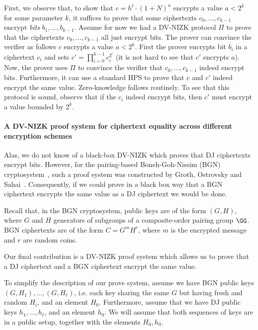 First, we observe that, to show that $c = h^t \cdot (1 + N)^a$ encrypts a value $a < 2^k$ for some parameter $k$, it suffices to prove that some ciphertexts $c_0,\dots,c_{k-1}$ encrypt \emph{bits} $b_1,\dots,b_{k-1}$. Assume for now we had a DV-NIZK protocol $\Pi$ to prove that the ciphertexts $c_0,\dots,c_{k-1}$ all just encrypt bits. The prover can convince the verifier as follows $c$ encrypts a value $a < 2^k$. First the prover encrypts bit $b_i$ in a ciphertext $c_i$ and sets $c' = \prod_{i = 0}^{k-1} c_i^{2^i}$ (it is not hard to see that $c'$ encrypts $a$). Now, the prover uses $\Pi$ to convince the verifier that $c_0,\dots,c_{k-1}$ indeed encrypt bits. Furthermore, it can use a standard HPS to prove that $c$ and $c'$ indeed encrypt the same value. Zero-knowledge follows routinely. To see that this protocol is sound, observe that if the $c_i$ indeed encrypt bits, then $c'$ must encrypt a value bounded by $2^k$.

\paragraph{A DV-NIZK proof system for ciphertext equality across different encryption schemes}

Alas, we do not know of a black-box DV-NIZK which proves that DJ ciphertexts encrypt bits. However, for the pairing-based Boneh-Goh-Nissim (BGN) cryptosystem~\cite{TCC:BonGohNis05}, such a proof system was constructed by Groth, Ostrovsky and Sahai~\cite{EC:GroOstSah06}. Consequently, if we could prove in a black box way that a BGN ciphertext encrypts the same value as a DJ ciphertext we would be done.

Recall that, in the BGN cryptosystem, public keys are of the form $(G,H)$, where $G$ and $H$ generators of subgroups of a composite-order pairing group $\GG$. BGN ciphertexts are of the form $C=G^{m}H^r$, where $m$ is the encrypted message and $r$ are random coins.

Our final contribution is a DV-NIZK proof system which allows us to prove that a DJ ciphertext and a BGN ciphertext encrypt the same value.

To simplify the description of our prove system, assume we have BGN public keys $(G,H_1),\dots,(G,H_\ell)$, i.e. each key sharing the same $G$ but having fresh and random $H_i$, and an element $H_0$. Furthermore, assume that we have DJ public keys $h_1,\dots,h_\ell$, and an element $h_0$. We will assume that both sequences of keys are in a public setup, together with the elements $H_0,h_0$.

